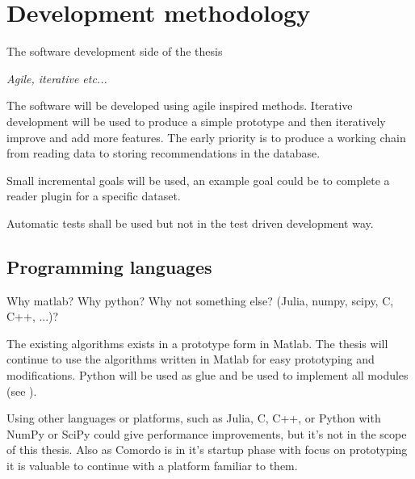\section{Development methodology}

The software development side of the thesis

\textit{Agile, iterative etc...}

The software will be developed using agile inspired methods. Iterative development will be used to produce a simple prototype and then iteratively improve and add more features. The early priority is to produce a working chain from reading data to storing recommendations in the database.

Small incremental goals will be used, an example goal could be to complete a reader plugin for a specific dataset.

Automatic tests shall be used but not in the test driven development way.


\subsection{Programming languages}

Why matlab? Why python? Why not something else? (Julia, numpy, scipy, C, C++, ...)?

The existing algorithms exists in a prototype form in Matlab. The thesis will continue to use the algorithms written in Matlab for easy prototyping and modifications. Python will be used as glue and be used to implement all modules (see ).

Using other languages or platforms, such as Julia, C, C++, or Python with NumPy or SciPy could give performance improvements, but it's not in the scope of this thesis. Also as Comordo is in it's startup phase with focus on prototyping it is valuable to continue with a platform familiar to them.


